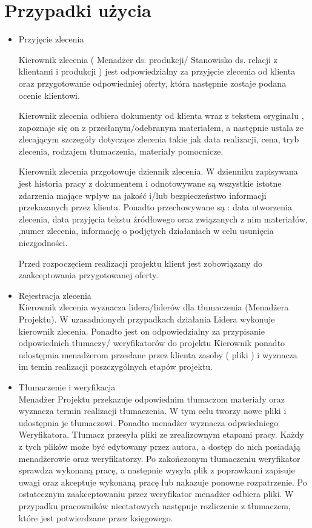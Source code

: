 \documentclass[licencjacka]{pracamgr}
\begin{document}
\section{Przypadki użycia}
\begin{itemize} 
\item Przyjęcie zlecenia

Kierownik zlecenia ( Menadżer ds. produkcji/ Stanowisko ds. relacji z klientami i produkcji ) 
jest odpowiedzialny za przyjęcie zlecenia od klienta oraz przygotowanie odpowiedniej oferty, 
która następnie zostaje podana ocenie klientowi.

Kierownik zlecenia odbiera dokumenty od klienta wraz z tekstem oryginału , zapoznaje się on z przesłanym/odebranym materiałem,
a następnie ustala ze zlecającym szczegóły dotyczące zlecenia takie jak data realizacji, cena,  tryb zlecenia, rodzajem tłumaczenia,  
materiały pomocnicze.

Kierownik zlecenia przgotowuje dziennik zlecenia. W dzienniku zapisywana jest historia pracy z dokumentem i 
odnotowywane są wszystkie istotne zdarzenia mające wpływ na jakość i/lub bezpieczeństwo informacji przekazanych przez klienta. 
Ponadto przechowywane są : data utworzenia zlecenia, data przyjęcia tekstu źródłowego oraz związanych z nim materiałów,
,numer zlecenia, informację o podjętych działaniach w celu usunięcia niezgodności. 

Przed rozpoczęciem realizacji projektu klient jest zobowiązany do zaakceptowania przygotowanej oferty.

\item Rejestracja zlecenia \\
Kierownik zlecenia wyznacza lidera/liderów dla tłumaczenia (Menadżera Projektu). W uzasadnionych przypadkach działania Lidera wykonuje kierownik zlecenia.
Ponadto jest on odpowiedzialny za przypisanie odpowiednich tłumaczy/ weryfikatorów do projektu
Kierownik ponadto udostępnia menadżerom przesłane przez klienta zasoby ( pliki ) i wyznacza im temin realizacji poszczygólnych etapów projektu.

\item Tłumaczenie i weryfikacja\\
Menadżer Projektu przekazuje odpowiednim tłumaczom materiały oraz wyznacza termin realizacji tłumaczenia.
W tym celu tworzy nowe pliki i udostępnia je tłumaczowi.
Ponadto menadżer wyznacza odpwiedniego Weryfikatora.
Tłumacz przesyła pliki ze zrealizownym etapami pracy. Każdy z tych plików może być edytowany przez autora, a dostęp do nich posiadają menadżerowie oraz weryfikatorzy.
Po zakończonym tłumaczeniu weryfikator sprawdza wykonaną pracę, a następnie wysyła plik z poprawkami zapisuje uwagi oraz akceptuje wykonaną pracę lub nakazuje ponowne rozpatrzenie.
Po ostatecznym zaakceptowaniu przez weryfikator menadżer odbiera pliki.
W przypadku pracowników nieetatowych następuje rozliczenie z tłumaczem, które jest potwierdzane przez księgowego.


\end{itemize}
\end{document}
